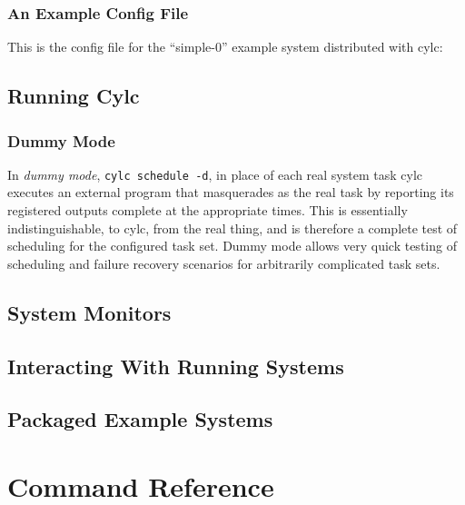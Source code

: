 \documentclass[11pt,a4paper]{article}
\begin{document}
\pagebreak

\subsubsection{An Example Config File}

This is the config file for the ``simple-0'' example system distributed
with cylc: 

\lstset{ language=Python }
{

}

\pagebreak

\lstset{language=}

\pagebreak
\subsection{Running Cylc}

\label{sec:dummymode}
\subsubsection{Dummy Mode}

In {\em dummy mode}, \lstinline=cylc schedule -d=, in place of each real
system task cylc executes an external program that masquerades as the
real task by reporting its registered outputs complete at the appropriate
times. This is essentially indistinguishable, to cylc, from the real
thing, and is therefore a complete test of scheduling for the configured
task set. Dummy mode allows very quick testing of scheduling and failure
recovery scenarios for arbitrarily complicated task sets.


\subsection{System Monitors}

\subsection{Interacting With Running Systems}

\subsection{Packaged Example Systems}

\pagebreak
\section{Command Reference}
\end{document}
